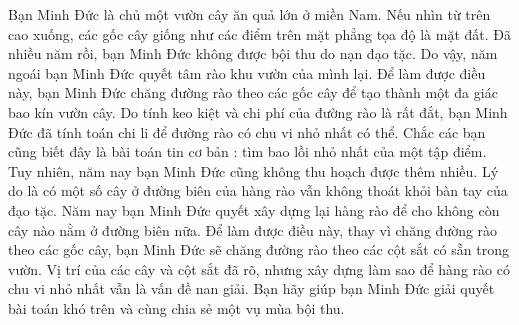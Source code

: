 Bạn Minh Đức là chủ một vườn cây ăn quả lớn ở miền Nam. Nếu nhìn từ trên cao xuống, các gốc cây giống như các điểm trên mặt phẳng tọa độ là mặt đất. Đã nhiều năm rồi, bạn Minh Đức không được bội thu do nạn đạo tặc. Do vậy, năm ngoái bạn Minh Đức quyết tâm rào khu vườn của mình lại. Để làm được điều này, bạn Minh Đức chăng đường rào theo các gốc cây để tạo thành một đa giác bao kín vườn cây. Do tính keo kiệt và chi phí của đường rào là rất đắt, bạn Minh Đức đã tính toán chi li để đường rào có chu vi nhỏ nhất có thể. Chắc các bạn cũng biết đây là bài toán tin cơ bản : tìm bao lồi nhỏ nhất của một tập điểm. Tuy nhiên, năm nay bạn Minh Đức cũng không thu hoạch được thêm nhiều. Lý do là có một số cây ở đường biên của hàng rào vẫn không thoát khỏi bàn tay của đạo tặc. Năm nay bạn Minh Đức quyết xây dựng lại hàng rào để cho không còn cây nào nằm ở đường biên nữa. Để làm được điều này, thay vì chăng đường rào theo các gốc cây, bạn Minh Đức sẽ chăng đường rào theo các cột sắt có sẵn trong vườn. Vị trí của các cây và cột sắt đã rõ, nhưng xây dựng làm sao để hàng rào có chu vi nhỏ nhất vẫn là vấn đề nan giải. Bạn hãy giúp bạn Minh Đức giải quyết bài toán khó trên và cùng chia sẻ một vụ mùa bội thu.  

\